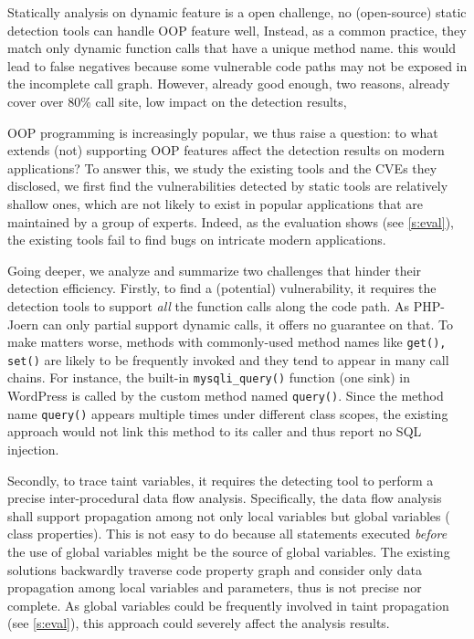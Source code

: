 Statically analysis on dynamic feature is a open challenge, no (open-source) static detection tools can handle OOP feature well, Instead, as a common practice, they match only dynamic function calls that have a unique method name. this would lead to false negatives because some vulnerable code paths may not be exposed in the incomplete call graph. However, already good enough, two reasons, already cover over 80\% call site\citep{php-cpg}, low impact on the detection results\citep{navex}, 

OOP programming is increasingly popular, we thus raise a question: to what extends (not) supporting OOP features affect the detection results on modern applications? To answer this, we study the existing tools and the CVEs they disclosed, we first find the vulnerabilities detected by static tools \citep{navex, php-cpg} are relatively shallow ones, which are not likely to exist in popular applications that are maintained by a group of experts. Indeed, as the evaluation shows (see \ref{s:eval}), the existing tools fail to find bugs on intricate modern applications.

Going deeper, we analyze and summarize two challenges that hinder their detection efficiency.
Firstly, to find a (potential) vulnerability, it requires the detection tools to support \emph{all} the function calls along the code path.
As PHP-Joern\citep{php-cpg} can only partial support dynamic calls, it offers no guarantee on that. 
To make matters worse, methods with commonly-used method names like \lstinline{get(), set()} are likely to be frequently invoked and they tend to appear in many call chains.
For instance, the built-in \lstinline{mysqli_query()} function (one sink) in WordPress is called by the custom method named \lstinline{query()}.
Since the method name \lstinline{query()} appears multiple times under different class scopes, the existing approach would not link this method to its caller and thus report no SQL injection.

Secondly, to trace taint variables, it requires the detecting tool to perform a precise inter-procedural data flow analysis.
Specifically, the data flow analysis shall support propagation among not only local variables but global variables (\eg{,} class properties).
This is not easy to do because all statements executed \emph{before} the use of global variables might be the source of global variables.
The existing solutions \citep{php-cpg, navex} backwardly traverse code property graph and consider only data propagation among local variables and parameters, thus is not precise nor complete.
As global variables could be frequently involved in taint propagation (see \ref{s:eval}), this approach could severely affect the analysis results.

